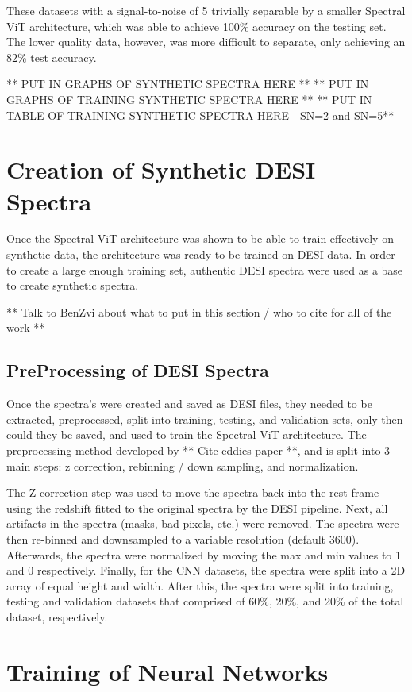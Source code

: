 These datasets with a signal-to-noise of 5 trivially separable by a smaller Spectral ViT architecture, 
which was able to achieve 100\% accuracy on the testing set. The lower quality data, however, 
was more difficult to separate, only achieving an 82\% test accuracy.

** PUT IN GRAPHS OF SYNTHETIC SPECTRA HERE **
** PUT IN GRAPHS OF TRAINING SYNTHETIC SPECTRA HERE **
** PUT IN TABLE OF TRAINING SYNTHETIC SPECTRA HERE - SN=2 and SN=5**

\section{Creation of Synthetic DESI Spectra}
\label{sec:synth_data}
Once the Spectral ViT architecture was shown to be able to train effectively on synthetic data,
the architecture was ready to be trained on DESI data. In order to create a large enough training 
set, authentic DESI spectra were used as a base to create synthetic spectra.

** Talk to BenZvi about what to put in this section / who to cite for all of the work **

\subsection{PreProcessing of DESI Spectra}
\label{ssec:preprocess}
Once the spectra's were created and saved as DESI files, they needed to be 
extracted, preprocessed, split into training, testing, and validation sets, 
only then could they be saved, and used to train the Spectral ViT architecture.
The preprocessing method developed by ** Cite eddies paper **, and is split into 
3 main steps: z correction, rebinning / down sampling, and normalization. 

The Z correction step was used to move the spectra back into the rest frame using 
the redshift fitted to the original spectra by the DESI pipeline. Next, all artifacts 
in the spectra (masks, bad pixels, etc.) were removed. The spectra were then re-binned
and downsampled to a variable resolution (default 3600). Afterwards, the spectra were 
normalized by moving the max and min values to 1 and 0 respectively. Finally, for the 
CNN datasets, the spectra were split into a 2D array of equal height and width. 
After this, the spectra were split into training, testing and validation datasets that 
comprised of 60\%, 20\%, and 20\% of the total dataset, respectively.
\section{Training of Neural Networks}
\label{sec:training} 

